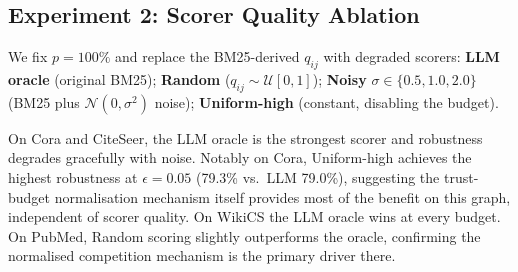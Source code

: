 \documentclass{article}
\begin{document}
\subsection{Experiment 2: Scorer Quality Ablation}
\label{sec:exp2}

We fix $p{=}100\%$ and replace the BM25-derived $q_{ij}$ with degraded
scorers: \textbf{LLM oracle} (original BM25); \textbf{Random}
($q_{ij}\!\sim\!\mathcal{U}[0,1]$); \textbf{Noisy}
$\sigma\in\{0.5,1.0,2.0\}$ (BM25 plus $\mathcal{N}(0,\sigma^2)$ noise);
\textbf{Uniform-high} (constant, disabling the budget).

On Cora and CiteSeer, the LLM oracle is the strongest scorer and robustness
degrades gracefully with noise. Notably on Cora, Uniform-high achieves the
highest robustness at $\epsilon{=}0.05$ (79.3\% vs.\ LLM 79.0\%), suggesting
the trust-budget normalisation mechanism itself provides most of the benefit
on this graph, independent of scorer quality. On WikiCS the LLM oracle wins
at every budget. On PubMed, Random scoring slightly outperforms the oracle,
confirming the normalised competition mechanism is the primary driver there.
\end{document}
